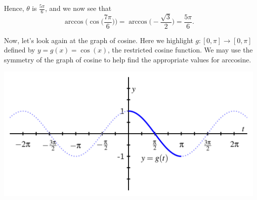 \documentclass{ximera}
\begin{document}
\begin{example}
\begin{enumerate}
\begin{explanation}
\begin{image}
\end{image}
%
Hence, $\theta$ is $\frac{5\pi}{6}$, and we now see that 
\begin{equation*}
\arccos\Big(\cos\Big(\frac{7\pi}{6}\Big)\Big) = \arccos\Big(\!-\frac{\sqrt{3}}{2}\Big) = \frac{5\pi}{6}.
\end{equation*}

Now, let's look again at the graph of cosine. Here we highlight $g: [0,\pi] \rightarrow [0,\pi]$ defined by $y=g(x)=\cos(x)$, the restricted cosine function. We may use the symmetry of the graph of cosine to help find the appropriate values for arccosine.
\begin{image}
\includegraphics[width=0.8\linewidth]{inverse-trig-PA-cosine.png}
\end{image}





\end{explanation}
\end{enumerate}
\end{example}
\end{document}
